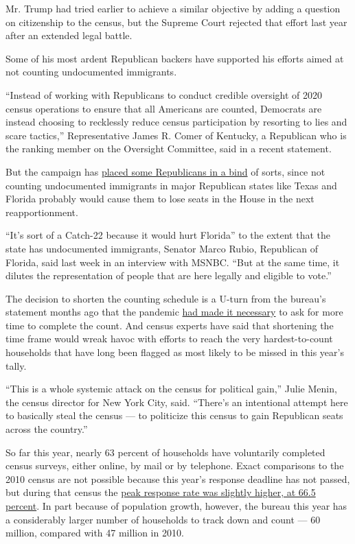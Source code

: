 Mr. Trump had tried earlier to achieve a similar objective by adding a
question on citizenship to the census, but the Supreme Court rejected
that effort last year after an extended legal battle.

Some of his most ardent Republican backers have supported his efforts
aimed at not counting undocumented immigrants.

``Instead of working with Republicans to conduct credible oversight of
2020 census operations to ensure that all Americans are counted,
Democrats are instead choosing to recklessly reduce census participation
by resorting to lies and scare tactics,'' Representative James R. Comer
of Kentucky, a Republican who is the ranking member on the Oversight
Committee, said in a recent statement.

But the campaign has
\href{https://www.msn.com/en-us/news/politics/trump-s-census-memo-puts-some-republicans-in-catch-22/ar-BB17gKkQ}{placed
some Republicans in a bind} of sorts, since not counting undocumented
immigrants in major Republican states like Texas and Florida probably
would cause them to lose seats in the House in the next reapportionment.

``It's sort of a Catch-22 because it would hurt Florida'' to the extent
that the state has undocumented immigrants, Senator Marco Rubio,
Republican of Florida, said last week in an interview with MSNBC. ``But
at the same time, it dilutes the representation of people that are here
legally and eligible to vote.''

The decision to shorten the counting schedule is a U-turn from the
bureau's statement months ago that the pandemic
\href{https://www.nytimes.com/2020/04/13/us/census-coronavirus-delay.html?searchResultPosition=12}{had
made it necessary} to ask for more time to complete the count. And
census experts have said that shortening the time frame would wreak
havoc with efforts to reach the very hardest-to-count households that
have long been flagged as most likely to be missed in this year's tally.

``This is a whole systemic attack on the census for political gain,''
Julie Menin, the census director for New York City, said. ``There's an
intentional attempt here to basically steal the census --- to politicize
this census to gain Republican seats across the country.''

So far this year, nearly 63 percent of households have voluntarily
completed census surveys, either online, by mail or by telephone. Exact
comparisons to the 2010 census are not possible because this year's
response deadline has not passed, but during that census the
\href{https://www.politifact.com/factchecks/2020/jul/31/stacey-abrams/fact-checking-stacey-abrams-comparison-census-resp/}{peak
response rate was slightly higher, at 66.5 percent}. In part because of
population growth, however, the bureau this year has a considerably
larger number of households to track down and count --- 60 million,
compared with 47 million in 2010.


